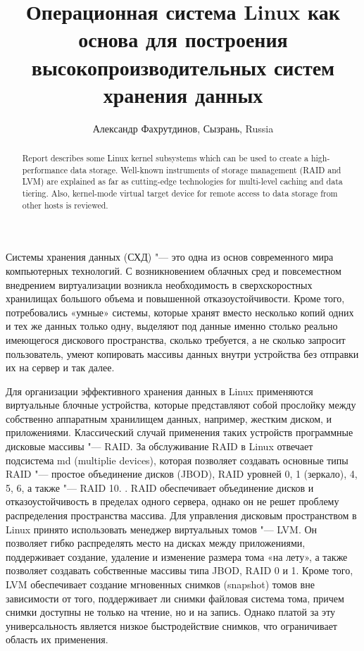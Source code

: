 \documentclass[10pt, a5paper]{article}
\begin{document}
\title{Операционная система Linux как основа для построения высокопроизводительных систем хранения данных}
\author{Александр Фахрутдинов, Сызрань, Russia}
\maketitle
\begin{abstract}
Report describes some Linux kernel subsystems which can be used to create a high-performance data storage. Well-known instruments of storage management (RAID and LVM) are explained as far as cutting-edge technologies for multi-level caching and data tiering. Also, kernel-mode virtual target device  for remote access to data storage from other hosts is reviewed.
\end{abstract}
Системы хранения данных (СХД) "--- это одна из основ современного мира компьютерных технологий. С возникновением облачных сред и повсеместном внедрением виртуализации возникла необходимость в сверхскоростных хранилищах большого объема и повышенной  отказоустойчивости. Кроме того, потребовались «умные» системы, которые хранят вместо несколько копий одних и тех же данных только одну, выделяют под данные именно столько реально имеющегося дискового пространства, сколько требуется, а не сколько запросит пользователь, умеют копировать массивы данных внутри устройства без отправки их на сервер и так далее.

Для организации эффективного хранения данных в Linux применяются виртуальные блочные устройства, которые представляют собой прослойку между собственно аппаратным хранилищем данных, например, жестким диском, и приложениями. Классический случай применения таких устройств программные дисковые массивы "--- RAID. За   обслуживание  RAID в Linux отвечает подсистема md (multiplie devices), которая позволяет создавать основные типы RAID "--- простое объединение дисков (JBOD), RAID уровней 0, 1 (зеркало), 4, 5, 6, а также "--- RAID 10.
.
RAID обеспечивает объединение дисков и отказоустойчивость в пределах одного сервера, однако он не решет проблему распределения пространства массива. Для управления дисковым пространством в Linux принято использовать менеджер виртуальных томов "--- LVM. Он позволяет гибко распределять место на дисках между приложениями, поддерживает создание, удаление и изменение размера тома «на лету», а также позволяет создавать собственные массивы типа JBOD,  RAID 0 и 1. Кроме того, LVM обеспечивает создание мгновенных снимков (snapshot) томов вне зависимости от того, поддерживает ли снимки файловая система тома, причем снимки доступны не только на чтение, но и на запись.  Однако платой за эту универсальность является низкое быстродействие снимков, что ограничивает область их применения.
\end{document}
